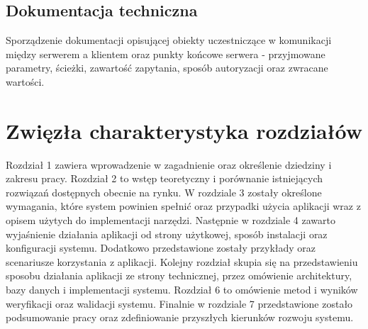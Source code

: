 \subsection{Dokumentacja techniczna}
Sporządzenie dokumentacji opisującej obiekty uczestniczące w komunikacji między serwerem a klientem oraz punkty końcowe serwera - przyjmowane parametry, ścieżki, zawartość zapytania, sposób autoryzacji oraz zwracane wartości. 
\section{Zwięzła charakterystyka rozdziałów}

Rozdział 1 zawiera wprowadzenie w zagadnienie oraz określenie dziedziny i zakresu pracy. Rozdział 2 to wstęp teoretyczny i porównanie istniejących rozwiązań dostępnych obecnie na rynku. W rozdziale 3 zostały określone wymagania, które system powinien spełnić oraz przypadki użycia aplikacji wraz z opisem użytych do implementacji narzędzi. Następnie w rozdziale 4 zawarto wyjaśnienie działania aplikacji od strony użytkowej, sposób instalacji oraz konfiguracji systemu. Dodatkowo przedstawione zostały przykłady oraz scenariusze korzystania z aplikacji. Kolejny rozdział skupia się na przedstawieniu sposobu działania aplikacji ze strony technicznej, przez omówienie architektury, bazy danych i implementacji systemu. Rozdział 6 to omówienie metod i wyników weryfikacji oraz walidacji systemu. Finalnie w rozdziale 7 przedstawione zostało podsumowanie pracy oraz zdefiniowanie przyszłych kierunków rozwoju systemu.

